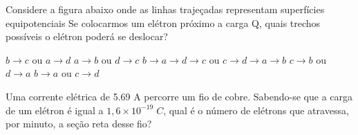 \documentclass[12pt, addpoints]{exam}
\begin{document}
    \begin{questions}
\begin{multicols*}{2}
\question Considere a figura abaixo onde as linhas trajeçadas representam superfícies equipotenciais Se colocarmos um elétron próximo a carga Q, quais trechos possíveis o elétron poderá se deslocar?
        
        \begin{center}
            \begin{minipage}[c]{0.5\linewidth}
            \end{minipage}
        \end{center}
        
        

\begin{choices}
\choice $b\rightarrow c$ ou $a\rightarrow d$ 
\choice $a\rightarrow b$ ou $d\rightarrow c$ 
\choice $b\rightarrow a\rightarrow d\rightarrow c$ ou $c\rightarrow d\rightarrow a\rightarrow b$ 
\choice $c\rightarrow b$ ou $d\rightarrow a$ 
\choice $b\rightarrow a$ ou $c\rightarrow d$ 
\end{choices}
\question Uma corrente elétrica de    5.69 A percorre um ﬁo de cobre. Sabendo-se que a carga de um elétron é igual a $1,6\times 10^{-19}\;C$, qual é o número de elétrons que atravessa, por minuto, a seção reta desse ﬁo?


\end{multicols*}
\end{questions}
\end{document}
